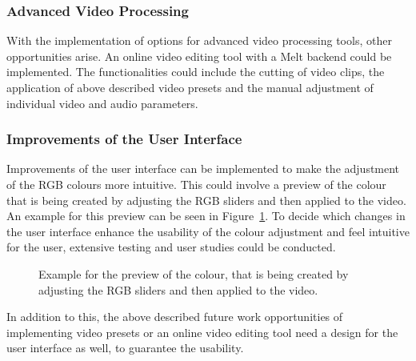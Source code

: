 \documentclass[../MasterThesis.tex]{subfiles}
\begin{document}
\subsubsection*{Advanced Video Processing}

With the implementation of options for advanced video processing tools, other opportunities arise. An online video editing tool with a Melt backend could be implemented. The functionalities could include the cutting of video clips, the application of above described video presets and the manual adjustment of individual video and audio parameters.










\subsubsection*{Improvements of the User Interface}


Improvements of the user interface can be implemented to make the adjustment of the RGB colours more intuitive. This could involve a preview of the colour that is being created by adjusting the RGB sliders and then applied to the video. An example for this preview can be seen in Figure~\ref{figure:UI}.
To decide which changes in the user interface enhance the usability of the colour adjustment and feel intuitive for the user, extensive testing and user studies could be conducted.

\begin{figure}[H]
	\begin{center}
		\caption[Example for the colour preview of the RGB sliders.]{Example for the preview of the colour, that is being created by adjusting the RGB sliders and then applied to the video.}
		\label{figure:UI}
	\end{center}
\end{figure}



In addition to this, the above described future work opportunities of implementing video presets or an online video editing tool need a design for the user interface as well, to guarantee the usability. 
\end{document}
